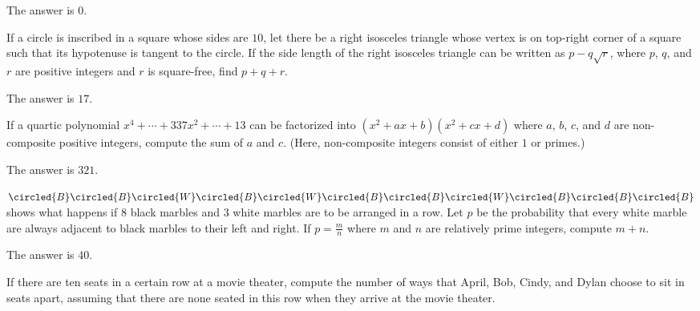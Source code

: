 \begin{solution}
The answer is $0$.
\end{solution}

\begin{problem}
If a circle is inscribed in a square whose sides are $10$, let there be a right isosceles triangle whose vertex is on top-right corner of a square such that its hypotenuse is tangent to the circle. If the side length of the right isosceles triangle can be written as $p-q\sqrt{r}$, where $p$, $q$, and $r$ are positive integers and $r$ is square-free, find $p+q+r$.
\end{problem}

\begin{solution}
The answer is $17$.
\end{solution}

\begin{problem}
If a quartic polynomial $x^4+\cdots+337x^2+\cdots+13$ can be factorized into $(x^2+ax+b)(x^2+cx+d)$ where $a$, $b$, $c$, and $d$ are non-composite positive integers, compute the sum of $a$ and $c$. (Here, non-composite integers consist of either $1$ or primes.)
\end{problem}

\begin{solution}
The answer is $321$.
\end{solution}

\begin{problem}
$ \circled{B} \hfill \circled {B} \hfill \circled{W} \hfill \circled{B} \hfill \circled{W} \hfill \circled{B} \hfill \circled{B} \hfill \circled{W} \hfill \circled{B} \hfill \circled{B} \hfill \circled{B}$ shows what happens if $8$ black marbles and $3$ white marbles are to be arranged in a row. Let $p$ be the probability that every white marble are always adjacent to black marbles to their left and right. If $p=\frac{m}{n}$ where $m$ and $n$ are relatively prime integers, compute $m+n$.
\end{problem}

\begin{solution}
The answer is $40$.
\end{solution}

\begin{problem}
If there are ten seats in a certain row at a movie theater, compute the number of ways that April, Bob, Cindy, and Dylan choose to sit in seats apart, assuming that there are none seated in this row when they arrive at the movie theater.
\end{problem}

